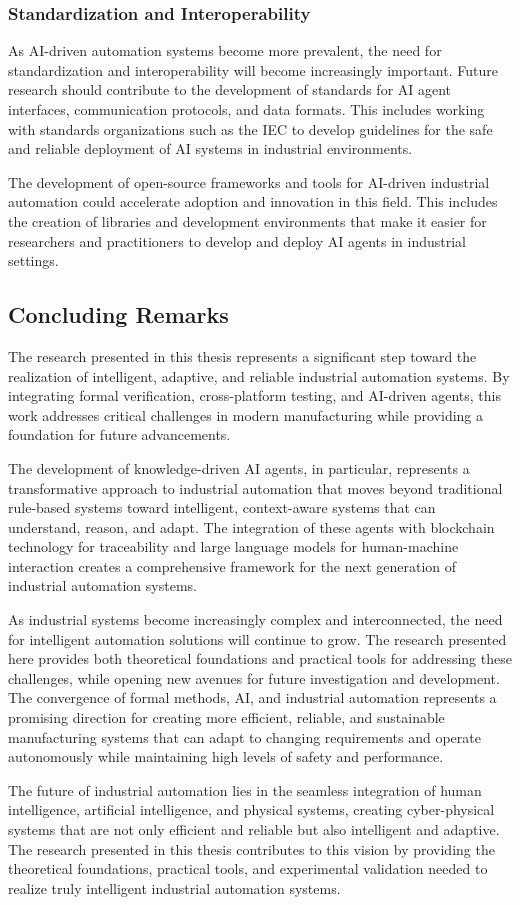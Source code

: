 \subsubsection{Standardization and Interoperability}

As AI-driven automation systems become more prevalent, the need for standardization and interoperability will become increasingly important. Future research should contribute to the development of standards for AI agent interfaces, communication protocols, and data formats. This includes working with standards organizations such as the IEC to develop guidelines for the safe and reliable deployment of AI systems in industrial environments.

The development of open-source frameworks and tools for AI-driven industrial automation could accelerate adoption and innovation in this field. This includes the creation of libraries and development environments that make it easier for researchers and practitioners to develop and deploy AI agents in industrial settings.

\subsection{Concluding Remarks}

The research presented in this thesis represents a significant step toward the realization of intelligent, adaptive, and reliable industrial automation systems. By integrating formal verification, cross-platform testing, and AI-driven agents, this work addresses critical challenges in modern manufacturing while providing a foundation for future advancements.

The development of knowledge-driven AI agents, in particular, represents a transformative approach to industrial automation that moves beyond traditional rule-based systems toward intelligent, context-aware systems that can understand, reason, and adapt. The integration of these agents with blockchain technology for traceability and large language models for human-machine interaction creates a comprehensive framework for the next generation of industrial automation systems.

As industrial systems become increasingly complex and interconnected, the need for intelligent automation solutions will continue to grow. The research presented here provides both theoretical foundations and practical tools for addressing these challenges, while opening new avenues for future investigation and development. The convergence of formal methods, AI, and industrial automation represents a promising direction for creating more efficient, reliable, and sustainable manufacturing systems that can adapt to changing requirements and operate autonomously while maintaining high levels of safety and performance.

The future of industrial automation lies in the seamless integration of human intelligence, artificial intelligence, and physical systems, creating cyber-physical systems that are not only efficient and reliable but also intelligent and adaptive. The research presented in this thesis contributes to this vision by providing the theoretical foundations, practical tools, and experimental validation needed to realize truly intelligent industrial automation systems.
